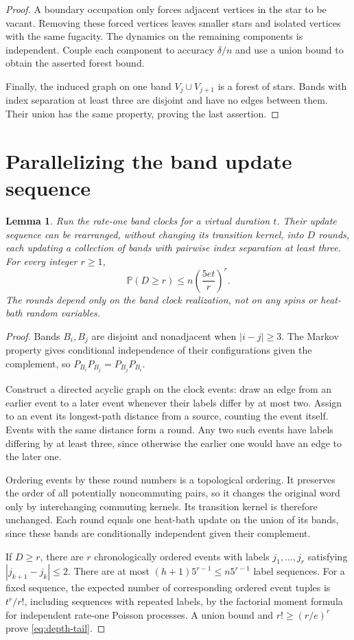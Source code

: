 \documentclass[11pt]{article}
\newtheorem{lemma}[theorem]{Lemma}
\newcommand{\Prb}{\mathbb P}
\begin{document}
\begin{proof}
A boundary occupation only forces adjacent vertices in the star to be vacant. Removing these forced vertices leaves smaller stars and isolated vertices with the same fugacity. The dynamics on the remaining components is independent. Couple each component to accuracy $\delta/n$ and use a union bound to obtain the asserted forest bound.

Finally, the induced graph on one band $V_j\cup V_{j+1}$ is a forest of stars. Bands with index separation at least three are disjoint and have no edges between them. Their union has the same property, proving the last assertion.
\end{proof}

\section{Parallelizing the band update sequence}

\begin{lemma}\label{lem:parallel}
Run the rate-one band clocks for a virtual duration $t$. Their update sequence can be rearranged, without changing its transition kernel, into $D$ rounds, each updating a collection of bands with pairwise index separation at least three. For every integer $r\ge1$,
\begin{equation}\label{eq:depth-tail}
\Prb(D\ge r)\le n\left(\frac{5et}{r}\right)^r.
\end{equation}
The rounds depend only on the band clock realization, not on any spins or heat-bath random variables.
\end{lemma}

\begin{proof}
Bands $B_i,B_j$ are disjoint and nonadjacent when $|i-j|\ge3$. The Markov property gives conditional independence of their configurations given the complement, so $P_{B_i}P_{B_j}=P_{B_j}P_{B_i}$.

Construct a directed acyclic graph on the clock events: draw an edge from an earlier event to a later event whenever their labels differ by at most two. Assign to an event its longest-path distance from a source, counting the event itself. Events with the same distance form a round. Any two such events have labels differing by at least three, since otherwise the earlier one would have an edge to the later one.

Ordering events by these round numbers is a topological ordering. It preserves the order of all potentially noncommuting pairs, so it changes the original word only by interchanging commuting kernels. Its transition kernel is therefore unchanged. Each round equals one heat-bath update on the union of its bands, since these bands are conditionally independent given their complement.

If $D\ge r$, there are $r$ chronologically ordered events with labels $j_1,\ldots,j_r$ satisfying $|j_{k+1}-j_k|\le2$. There are at most $(h+1)5^{r-1}\le n5^{r-1}$ label sequences. For a fixed sequence, the expected number of corresponding ordered event tuples is $t^r/r!$, including sequences with repeated labels, by the factorial moment formula for independent rate-one Poisson processes. A union bound and $r!\ge(r/e)^r$ prove \eqref{eq:depth-tail}.
\end{proof}
\end{document}
